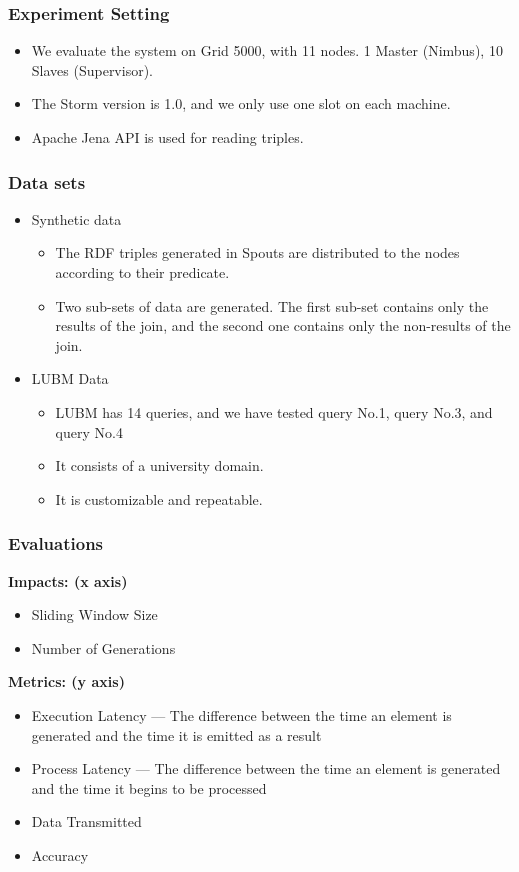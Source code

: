 \begin{frame}
\frametitle{Experiment Setting}
\begin{itemize}
\item We evaluate the system on Grid 5000, with 11 nodes. 1 Master (Nimbus), 10 Slaves (Supervisor). 

\item The Storm version is 1.0, and we only use one slot on each machine.

\item Apache Jena API is used for reading triples.
\end{itemize}

\end{frame}

\begin{frame}
\frametitle{Data sets}
\begin{itemize}
\item Synthetic data
\begin{itemize}
\item The RDF triples generated in Spouts are distributed to the nodes according to their predicate. 
\item Two sub-sets of data are generated. The  first sub-set contains only the results of the join, and the second one contains only the non-results of the join.
\end{itemize}
\item LUBM Data 
\begin{itemize}
\item LUBM has 14 queries, and we have tested query No.1, query No.3, and query No.4
\item It consists of a university domain. 
\item It is customizable and repeatable.
\end{itemize}
\end{itemize}
\end{frame}

\begin{frame}
\frametitle{Evaluations}
\textbf{Impacts: (x axis)}
\begin{itemize}
\item Sliding Window Size
\item Number of Generations
\end{itemize}
\textbf{Metrics: (y axis)}
\begin{itemize}
\item Execution Latency --- The difference between the time an element is generated and the time it is emitted as a result
\item Process Latency --- The difference between the time an element is generated and the time it begins to be processed
\item Data Transmitted
\item Accuracy
\end{itemize}
\end{frame}

